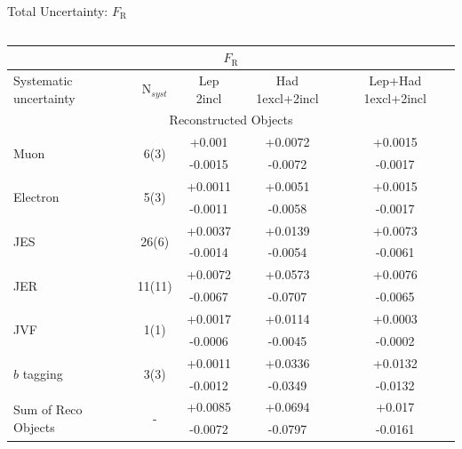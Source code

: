 \documentclass{beamer}
\newcommand*{\fr}{\ensuremath{F_{\text{R}}}\xspace}
\newcommand*{\bt}{\ensuremath{b}\xspace}
\begin{document}
{\begin{frame}{Total Uncertainty: \fr}
\begin{columns}
\begin{table}[h!]
        \begin{tabular}{lcccc}
          \hline\hline
          \multicolumn{5}{c}{\fr}\\
          \hline
          Systematic uncertainty & N$_{syst}$ & Lep 2incl & Had 1excl+2incl & Lep+Had 1excl+2incl \\\hline
          \multicolumn{5}{c}{Reconstructed Objects} \\\hline
          \multirow{2}{*}{Muon} & \multirow{2}{*}{6(3)} & +0.001 & +0.0072 & +0.0015\\
                                 &                       & -0.0015 & -0.0072 & -0.0017\\\hline
          \multirow{2}{*}{Electron} & \multirow{2}{*}{5(3)} & +0.0011 & +0.0051 & +0.0015\\
                                 &                       & -0.0011 & -0.0058 & -0.0017\\\hline
          \multirow{2}{*}{JES} & \multirow{2}{*}{26(6)} & +0.0037 & +0.0139 & +0.0073\\
                                 &                       & -0.0014 & -0.0054 & -0.0061\\\hline
          \multirow{2}{*}{JER} & \multirow{2}{*}{11(11)} & +0.0072 & +0.0573 & +0.0076\\
                                 &                       & -0.0067 & -0.0707 & -0.0065\\\hline
          \multirow{2}{*}{JVF} & \multirow{2}{*}{1(1)} & +0.0017 & +0.0114 & +0.0003\\
                                 &                       & -0.0006 & -0.0045 & -0.0002\\\hline
          \multirow{2}{*}{\bt tagging} & \multirow{2}{*}{3(3)} & +0.0011 & +0.0336 & +0.0132\\
                                 &                       & -0.0012 & -0.0349 & -0.0132\\\hline
          
          \hline\hline
          \multirow{2}{*}{Sum of Reco Objects} & \multirow{2}{*}{-} & +0.0085 & +0.0694 & +0.017\\
                                 &                       & -0.0072 & -0.0797 & -0.0161\\\hline
          

\end{tabular}
\end{table}
\end{columns}
\end{frame}}
\end{document}
